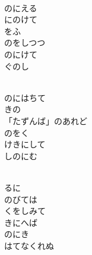 \documentclass[10pt,b5j]{tarticle} %
\begin{document}
\vspace{1.5em} %
\newcommand{\linespace}{0.5em} %
\newcommand{\blocksize}{0.5\hsize} %
\newcommand{\itemmargin}{3em} %
\begin{enumerate} %
    \setlength{\itemindent}{\itemmargin} %
    \begin{minipage}[c]{\blocksize}
    
        \vspace{\linespace}
        \item~\\
        のにえる\\
        にのけて\\
        をふ\\
        のをしつつ\\
        のにけて\\
        ぐのし
        
    \end{minipage}
    \begin{minipage}[c]{\blocksize}
        
        \vspace{\linespace}
        \item~\\
        のにはちて\\
        きの\\
        「たずんば」のあれど\\
        のをく\\
        けきにして\\
        しのにむ
        
    \end{minipage}
    \begin{minipage}[c]{\blocksize}
        
        \vspace{\linespace}
        \item~\\
        るに\\
        のびては\\
        くをしみて\\
        きにへば\\
        のにき\\
        はてなくれぬ
        

\end{minipage}
\end{enumerate}
\end{document}
